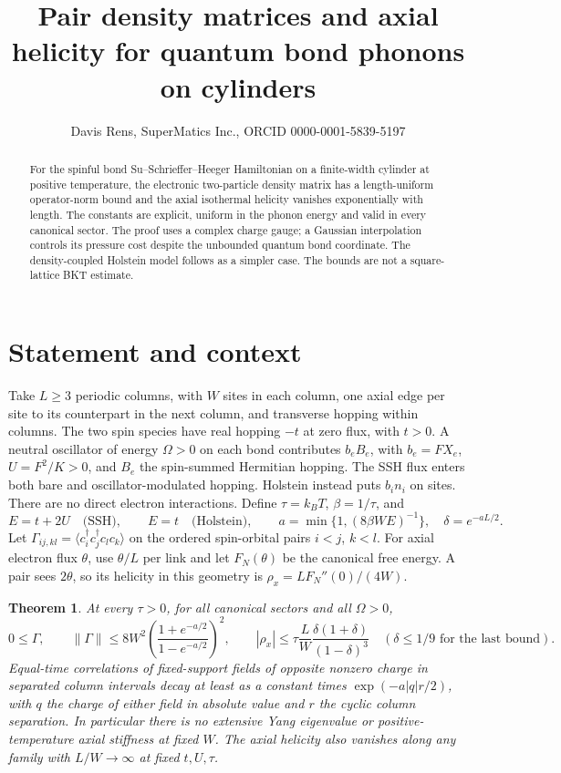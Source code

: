 \documentclass[11pt]{article}
\title{Pair density matrices and axial helicity for quantum bond phonons on cylinders}
\author{Davis Rens, SuperMatics Inc., ORCID 0000-0001-5839-5197}
\date{}
\newtheorem{theorem}{Theorem}
\begin{document}
\maketitle
\begin{abstract}
For the spinful bond Su--Schrieffer--Heeger Hamiltonian on a finite-width cylinder at positive temperature, the electronic two-particle density matrix has a length-uniform operator-norm bound and the axial isothermal helicity vanishes exponentially with length. The constants are explicit, uniform in the phonon energy and valid in every canonical sector. The proof uses a complex charge gauge; a Gaussian interpolation controls its pressure cost despite the unbounded quantum bond coordinate. The density-coupled Holstein model follows as a simpler case. The bounds are not a square-lattice BKT estimate.
\end{abstract}

\section{Statement and context}
Take $L\ge3$ periodic columns, with $W$ sites in each column, one axial edge per site to its counterpart in the next column, and transverse hopping within columns. The two spin species have real hopping $-t$ at zero flux, with $t>0$. A neutral oscillator of energy $\Omega>0$ on each bond contributes $b_eB_e$, with $b_e=FX_e$, $U=F^2/K>0$, and $B_e$ the spin-summed Hermitian hopping. The SSH flux enters both bare and oscillator-modulated hopping. Holstein instead puts $b_i n_i$ on sites. There are no direct electron interactions. Define $\tau=k_BT$, $\beta=1/\tau$, and
\[
 E=t+2U\quad\text{(SSH)},\qquad E=t\quad\text{(Holstein)},\qquad
 a=\min\{1,(8\beta WE)^{-1}\},\quad \delta=e^{-aL/2}.
\]
Let $\Gamma_{ij,kl}=\langle c_i^\dagger c_j^\dagger c_l c_k\rangle$ on the ordered spin-orbital pairs $i<j$, $k<l$. For axial electron flux $\theta$, use $\theta/L$ per link and let $F_N(\theta)$ be the canonical free energy. A pair sees $2\theta$, so its helicity in this geometry is $\rho_x=L F_N''(0)/(4W)$.

\begin{theorem}
At every $\tau>0$, for all canonical sectors and all $\Omega>0$,
\[
 0\le\Gamma,\qquad \|\Gamma\|\le8W^2\left(\frac{1+e^{-a/2}}{1-e^{-a/2}}\right)^2,
 \qquad |\rho_x|\le\tau\frac{L}{W}\frac{\delta(1+\delta)}{(1-\delta)^3}
 \quad(\delta\le1/9\text{ for the last bound}).
\]
Equal-time correlations of fixed-support fields of opposite nonzero charge in separated column intervals decay at least as a constant times $\exp(-a |q| r/2)$, with $q$ the charge of either field in absolute value and $r$ the cyclic column separation. In particular there is no extensive Yang eigenvalue or positive-temperature axial stiffness at fixed $W$. The axial helicity also vanishes along any family with $L/W\to\infty$ at fixed $t,U,\tau$.
\end{theorem}
\end{document}
